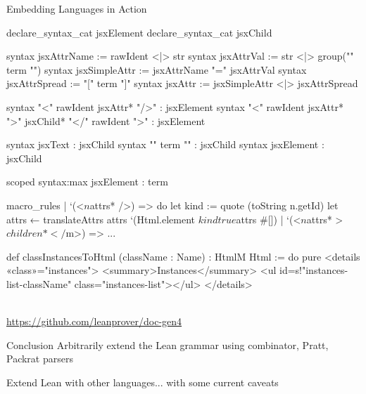 \documentclass[en,t]{sdqbeamer}
\begin{document}
\begin{frame}[fragile]{Embedding Languages in Action}%
  \vspace{-7mm}
  \begin{minipage}[t]{0.5\linewidth}%
\begin{leancode}
declare_syntax_cat jsxElement
declare_syntax_cat jsxChild

syntax jsxAttrName := rawIdent <|> str
syntax jsxAttrVal := str <|> group("{" term "}")
syntax jsxSimpleAttr := jsxAttrName "=" jsxAttrVal
syntax jsxAttrSpread := "[" term "]"
syntax jsxAttr := jsxSimpleAttr <|> jsxAttrSpread

syntax "<" rawIdent jsxAttr* "/>" : jsxElement
syntax "<" rawIdent jsxAttr* ">" jsxChild* "</" rawIdent ">" : jsxElement

syntax jsxText      : jsxChild
syntax "{" term "}" : jsxChild
syntax jsxElement   : jsxChild

scoped syntax:max jsxElement : term
\end{leancode}
  \end{minipage}
  \begin{minipage}[t]{0.45\linewidth}%
\begin{leancode}
macro_rules
  | `(<$n $attrs* />) => do
    let kind := quote (toString n.getId)
    let attrs ← translateAttrs attrs
    `(Html.element $kind true $attrs #[])
  | `(<$n $attrs* >$children*</$m>) => ...
\end{leancode}
\begin{leancode}
def classInstancesToHtml (className : Name) : HtmlM Html := do
  pure
    <details «class»="instances">
        <summary>Instances</summary>
        <ul id={s!"instances-list-{className}"} class="instances-list"></ul>
    </details>
\end{leancode}
  \end{minipage}\\
  \footnotesize{\url{https://github.com/leanprover/doc-gen4}}
\end{frame}

\begin{frame}{Conclusion}
  Arbitrarily extend the Lean grammar using combinator, Pratt, Packrat parsers

  \bigskip

  Extend Lean with other languages... with some current caveats
\end{frame}
\end{document}

